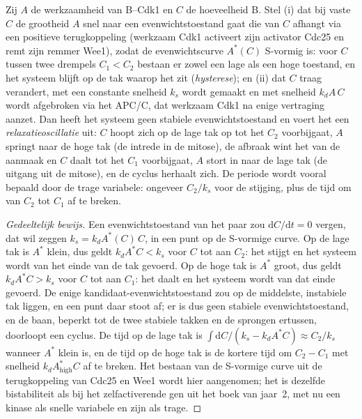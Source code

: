\begin{theorem}\label{thm:b3:cell-cycle-apoptosis:oscillator}
Zij $A$ de werkzaamheid van  B--Cdk1 en $C$ de hoeveelheid
 B. Stel (i) dat bij vaste $C$ de grootheid $A$ snel naar een
evenwichtstoestand gaat die van $C$ afhangt via een positieve
terugkoppeling (werkzaam Cdk1 activeert zijn activator Cdc25 en remt
zijn remmer Wee1), zodat de evenwichtscurve $A^{*}(C)$ S-vormig is:
voor $C$ tussen twee drempels $C_{1} < C_{2}$ bestaan er zowel een lage
als een hoge toestand, en het systeem blijft op de tak waarop het zit
(\emph{hysterese}); en (ii) dat $C$ traag verandert, met een constante
snelheid $k_{s}$ wordt gemaakt en met snelheid $k_{d}A\,C$ wordt
afgebroken via het APC/C, dat werkzaam Cdk1 na enige vertraging
aanzet. Dan heeft het systeem geen stabiele evenwichtstoestand en
voert het een \emph{relaxatieoscillatie} uit: $C$ hoopt zich op de lage
tak op tot het $C_{2}$ voorbijgaat, $A$ springt naar de hoge tak (de
intrede in de mitose), de afbraak wint het van de aanmaak en $C$ daalt
tot het $C_{1}$ voorbijgaat, $A$ stort in naar de lage tak (de uitgang
uit de mitose), en de cyclus herhaalt zich. De periode wordt vooral
bepaald door de trage variabele: ongeveer $C_{2}/k_{s}$ voor de
stijging, plus de tijd om van $C_{2}$ tot $C_{1}$ af te breken.
\end{theorem}
\begin{proof}[Gedeeltelijk bewijs]
Een evenwichtstoestand van het paar zou $\mathrm{d}C/\mathrm{d}t = 0$
vergen, dat wil zeggen $k_{s} = k_{d}A^{*}(C)\,C$, in een punt op de
S-vormige curve. Op de lage tak is $A^{*}$ klein, dus geldt
$k_{d}A^{*}C < k_{s}$ voor $C$ tot aan $C_{2}$: het  stijgt en
het systeem wordt van het einde van de tak gevoerd. Op de hoge tak is
$A^{*}$ groot, dus geldt $k_{d}A^{*}C > k_{s}$ voor $C$ tot aan
$C_{1}$: het  daalt en het systeem wordt van dat einde gevoerd.
De enige kandidaat-evenwichtstoestand zou op de middelste, instabiele
tak liggen, en een punt daar stoot af; er is dus geen stabiele
evenwichtstoestand, en de baan, beperkt tot de twee stabiele takken en
de sprongen ertussen, doorloopt een cyclus. De tijd op de lage tak is
$\int \mathrm{d}C/(k_{s} - k_{d}A^{*}C) \approx C_{2}/k_{s}$ wanneer
$A^{*}$ klein is, en de tijd op de hoge tak is de kortere tijd om
$C_{2} - C_{1}$ met snelheid $k_{d}A^{*}_{\text{high}}C$ af te breken.
Het bestaan van de S-vormige curve uit de terugkoppeling van Cdc25 en
Wee1 wordt hier aangenomen; het is dezelfde bistabiliteit als bij het
zelfactiverende gen uit het boek van jaar~2, met nu een kinase als
snelle variabele en zijn  als trage.
\end{proof}

